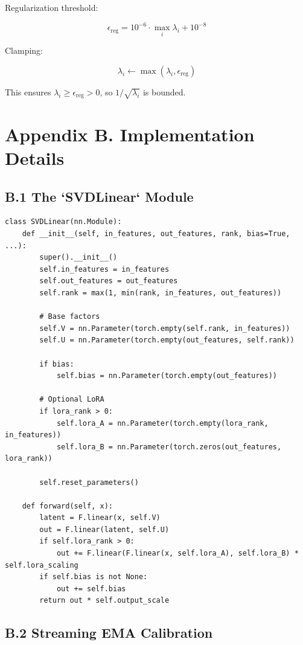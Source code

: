 Regularization threshold:

\[
\epsilon_\text{reg} = 10^{-6} \cdot \max_i \lambda_i + 10^{-8}
\tag{A.12}
\]

Clamping:

\[
\lambda_i \leftarrow \max(\lambda_i, \epsilon_\text{reg})
\tag{A.13}
\]

This ensures $\lambda_i \geq \epsilon_\text{reg} > 0$, so $1/\sqrt{\lambda_i}$ is bounded.


\section{Appendix B. Implementation Details}

\subsection{B.1 The `SVDLinear` Module}

\begin{lstlisting}
class SVDLinear(nn.Module):
    def __init__(self, in_features, out_features, rank, bias=True, ...):
        super().__init__()
        self.in_features = in_features
        self.out_features = out_features
        self.rank = max(1, min(rank, in_features, out_features))
        
        # Base factors
        self.V = nn.Parameter(torch.empty(self.rank, in_features))
        self.U = nn.Parameter(torch.empty(out_features, self.rank))
        
        if bias:
            self.bias = nn.Parameter(torch.empty(out_features))
        
        # Optional LoRA
        if lora_rank > 0:
            self.lora_A = nn.Parameter(torch.empty(lora_rank, in_features))
            self.lora_B = nn.Parameter(torch.zeros(out_features, lora_rank))
        
        self.reset_parameters()
    
    def forward(self, x):
        latent = F.linear(x, self.V)
        out = F.linear(latent, self.U)
        if self.lora_rank > 0:
            out += F.linear(F.linear(x, self.lora_A), self.lora_B) * self.lora_scaling
        if self.bias is not None:
            out += self.bias
        return out * self.output_scale
\end{lstlisting}

\subsection{B.2 Streaming EMA Calibration}

